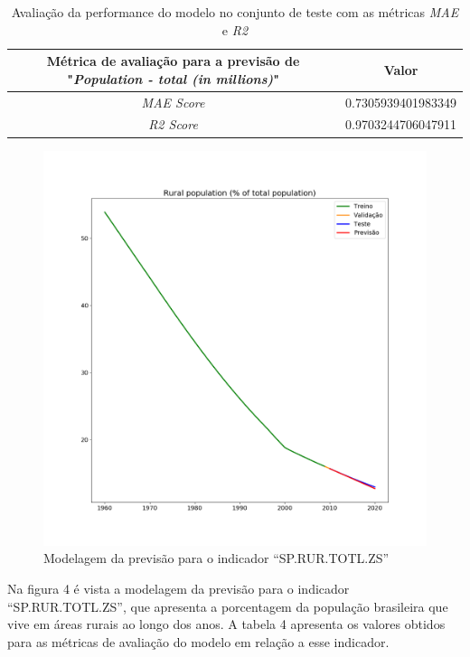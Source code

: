 \begin{table}[h!]
    \centering
    \begin{tabular}{|c|c|}
        \hline
        \multicolumn{1}{|p{5cm}|}{Métrica de avaliação para a previsão de "\emph{Population - total (in millions)}"} & Valor \\
        \hline 
        \emph{MAE Score} & 0.7305939401983349 \\
        \hline
        \emph{R2 Score} &  0.9703244706047911 \\
        \hline
    \end{tabular}
    \caption{Avaliação da performance do modelo no conjunto de teste com as métricas \emph{MAE} e \emph{R2}}
\end{table}

\begin{figure}[h!]
    \centering
    \includegraphics[scale=0.35]{images/Figure_2}
    \caption{Modelagem da previsão para o indicador ``SP.RUR.TOTL.ZS''}
\end{figure}

Na figura 4 é vista a modelagem da previsão para o indicador ``SP.RUR.TOTL.ZS'', 
que apresenta a porcentagem da população brasileira que vive em áreas rurais ao longo dos anos. 
A tabela 4 apresenta os valores obtidos para as métricas de avaliação do modelo em relação a esse indicador.

